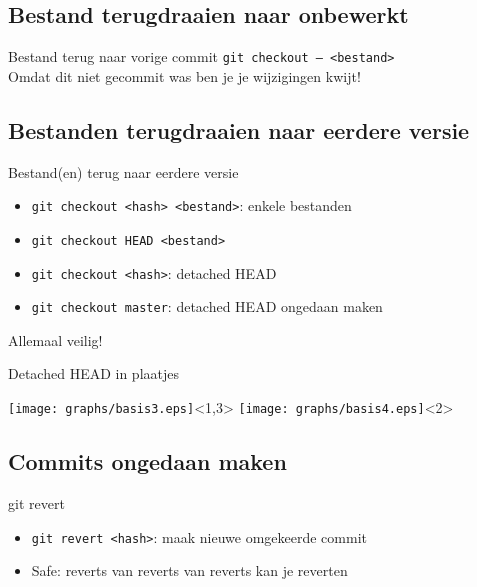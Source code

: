 \subsection{Bestand terugdraaien naar onbewerkt}
\begin{frame}{Bestand terug naar vorige commit}
	\texttt{git checkout -- <bestand>} \\
	\alert{Omdat dit niet gecommit was ben je je wijzigingen kwijt!}
\end{frame}

\subsection{Bestanden terugdraaien naar eerdere versie}
\begin{frame}{Bestand(en) terug naar eerdere versie}
	\begin{itemize}
		\item \texttt{git checkout <hash> <bestand>}: enkele bestanden
		\item \texttt{git checkout HEAD <bestand>}
		\item \texttt{git checkout <hash>}: detached HEAD
		\item \texttt{git checkout master}: detached HEAD ongedaan maken
	\end{itemize}

	Allemaal veilig!
\end{frame}

\begin{frame}{Detached HEAD in plaatjes}
	\begin{center}
		\texttt{[image: graphs/basis3.eps]}<1,3>
		\texttt{[image: graphs/basis4.eps]}<2>
	\end{center}
\end{frame}

\subsection{Commits ongedaan maken}
\begin{frame}{git revert}
	\begin{itemize}
		\item \texttt{git revert <hash>}: maak nieuwe omgekeerde commit
		\item Safe: reverts van reverts van reverts kan je reverten
	\end{itemize}
\end{frame}

